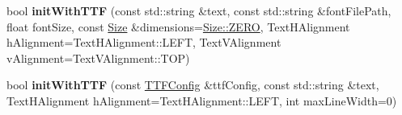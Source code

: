 \begin{DoxyCompactItemize}
\item 
\mbox{\label{classLabel_a09c434396714e27ef66bccf6cbd24b4d}} 
bool {\bfseries init\+With\+T\+TF} (const std\+::string \&text, const std\+::string \&font\+File\+Path, float font\+Size, const \hyperlink{classSize}{Size} \&dimensions=\hyperlink{classSize_a724334f12c8ef877c36b3f69e1257aa7}{Size\+::\+Z\+E\+RO}, Text\+H\+Alignment h\+Alignment=Text\+H\+Alignment\+::\+L\+E\+FT, Text\+V\+Alignment v\+Alignment=Text\+V\+Alignment\+::\+T\+OP)
\item 
\mbox{\label{classLabel_acc508cd3591ebac04f7170333a537f14}} 
bool {\bfseries init\+With\+T\+TF} (const \hyperlink{structTTFConfig}{T\+T\+F\+Config} \&ttf\+Config, const std\+::string \&text, Text\+H\+Alignment h\+Alignment=Text\+H\+Alignment\+::\+L\+E\+FT, int max\+Line\+Width=0)
\end{DoxyCompactItemize}
